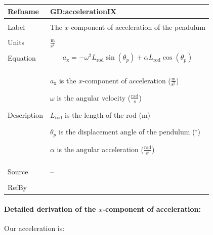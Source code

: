 \documentclass[12pt]{article}
\begin{document}
\vspace{\baselineskip}
\noindent
\begin{minipage}{\textwidth}
\begin{tabular}{>{\raggedright}p{}>{\raggedright\arraybackslash}p{}}
\toprule \textbf{Refname} & \textbf{GD:accelerationIX}
\label{GD:accelerationIX}
\\ \midrule \\
Label & The $x$-component of acceleration of the pendulum
        
\\ \midrule \\
Units & $\frac{\text{m}}{\text{s}^{2}}$
        
\\ \midrule \\
Equation & \begin{displaymath}
           {a_{\text{x}}}=-ω^{2} {L_{\text{rod}}} \sin\left({θ_{p}}\right)+α {L_{\text{rod}}} \cos\left({θ_{p}}\right)
           \end{displaymath}
\\ \midrule \\
Description & \begin{symbDescription}
              \item{${a_{\text{x}}}$ is the $x$-component of acceleration ($\frac{\text{m}}{\text{s}^{2}}$)}
              \item{$ω$ is the angular velocity ($\frac{\text{rad}}{\text{s}}$)}
              \item{${L_{\text{rod}}}$ is the length of the rod (${\text{m}}$)}
              \item{${θ_{p}}$ is the displacement angle of the pendulum (${{}^{\circ}}$)}
              \item{$α$ is the angular acceleration ($\frac{\text{rad}}{\text{s}^{2}}$)}
              \end{symbDescription}
\\ \midrule \\
Source & --
         
\\ \midrule \\
RefBy & 
\\ \bottomrule
\end{tabular}
\end{minipage}
\paragraph{Detailed derivation of the $x$-component of acceleration:}
\label{GD:accelerationIXDeriv}
Our acceleration is:
\end{document}
